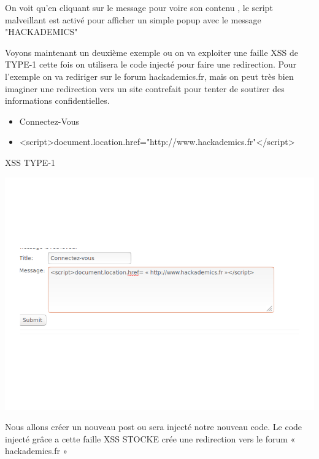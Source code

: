\bigskip

\begin{flushleft}
On voit qu'en cliquant sur le message pour voire son contenu , le script malveillant est activé pour afficher un simple popup avec le message "HACKADEMICS"

\bigskip

Voyons maintenant un deuxième exemple ou on va exploiter une faille XSS de TYPE-1 cette fois on utilisera le code injecté pour faire une redirection. Pour l'exemple on va rediriger sur le forum  hackademics.fr, mais on peut très bien imaginer une redirection vers un site contrefait pour tenter de soutirer des informations confidentielles.
\end{flushleft}

\bigskip

\begin{itemize}
\item Connectez-Vous
\item <script>document.location.href="http://www.hackademics.fr"</script>
\end{itemize}

\begin{center}
\caption{XSS TYPE-1}
\includegraphics[scale=0.3]{Web/assets/xsst100.png}
\end{center}

\bigskip

\begin{flushleft}
Nous allons créer un nouveau post ou sera injecté notre nouveau code. Le code injecté grâce a cette faille XSS STOCKE crée une redirection vers le forum « hackademics.fr »
\end{flushleft}


